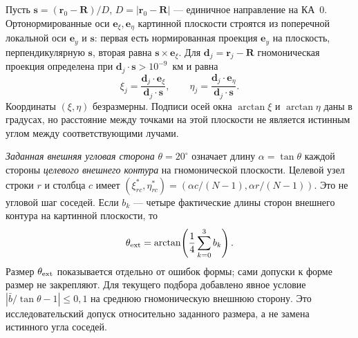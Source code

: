 \documentclass[a4paper,12pt]{article}
\begin{document}
Пусть $\mathbf s=(\mathbf r_0-\mathbf R)/D$,
$D=|\mathbf r_0-\mathbf R|$ --- единичное направление на КА~0.
Ортонормированные оси $\mathbf e_\xi,\mathbf e_\eta$ картинной
плоскости строятся из поперечной локальной оси $\mathbf e_y$ и
$\mathbf s$: первая есть нормированная проекция $\mathbf e_y$
на плоскость, перпендикулярную $\mathbf s$, вторая равна
$\mathbf s\times\mathbf e_\xi$. Для $\mathbf d_j=\mathbf r_j-\mathbf R$
гномоническая проекция определена при
$\mathbf d_j\cdot\mathbf s>10^{-9}$~км и равна
\begin{equation}
 \xi_j=\frac{\mathbf d_j\cdot\mathbf e_\xi}
             {\mathbf d_j\cdot\mathbf s},\qquad
 \eta_j=\frac{\mathbf d_j\cdot\mathbf e_\eta}
             {\mathbf d_j\cdot\mathbf s}.
 \label{eq:gnomonic}
\end{equation}
Координаты $(\xi,\eta)$ безразмерны. Подписи осей окна
$\arctan\xi$ и $\arctan\eta$ даны в градусах, но расстояние
между точками на этой плоскости не является истинным углом между
соответствующими лучами.

\emph{Заданная внешняя угловая сторона} $\theta=20^\circ$
означает длину $\alpha=\tan\theta$ каждой стороны \emph{целевого
внешнего контура} на гномонической плоскости. Целевой узел строки
$r$ и столбца $c$ имеет
$(\xi^*_{rc},\eta^*_{rc})=
(\alpha c/(N-1),\alpha r/(N-1))$.
Это не угловой шаг соседей. Если $b_k$ --- четыре фактические
длины сторон внешнего контура на картинной плоскости, то
\begin{equation}
 \theta_{\rm ext}=\arctan\!\left(\frac14\sum_{k=0}^3b_k\right).
 \label{eq:outer}
\end{equation}
Размер $\theta_{\rm ext}$ показывается отдельно от ошибок формы;
сами допуски к форме размер не закрепляют. Для текущего подбора
добавлено явное условие
$|\bar b/\tan\theta-1|\leq0{,}1$ на среднюю
гномоническую внешнюю сторону. Это исследовательский допуск
относительно заданного размера, а не замена истинного угла соседей.
\end{document}
